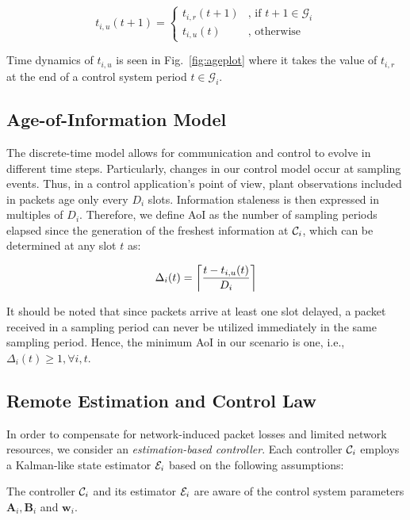 \begin{equation}
  \label{eq:t_u}
  t_{i, u}(t+1) =
  \begin{cases}
  t_{i, r}(t+1) & \text{, if } t+1 \in \mathcal{G}_i \\ 
  t_{i, u}(t) & \text{, otherwise}	
  \end{cases} 
\end{equation}

Time dynamics of $t_{i,u}$ is seen in Fig.~\ref{fig:ageplot} where it takes the
value of $t_{i,r}$ at the end of a control system period $t \in \mathcal{G}_i$.

\subsection{Age-of-Information Model}
The discrete-time model allows for communication and control to evolve in
different time steps. Particularly, changes in our control model occur at
sampling events. Thus, in a control application's point of view, plant
observations included in packets age only every $D_i$ slots. Information
staleness is then expressed in multiples of $D_i$. Therefore, we define AoI as
the number of sampling periods elapsed since the generation of the freshest
information at $\mathcal{C}_i$, which can be determined at any slot $t$ as:

\begin{equation}
  \label{eq:aoi}
  \Delta_i(t) = \left\lceil \dfrac{t - t_{i,u}(t)}{D_{i}} \right\rceil 
\end{equation}

It should be noted that since packets arrive at least one slot delayed, a packet
received in a sampling period can never be utilized immediately in the same
sampling period. Hence, the minimum AoI in our scenario is one, i.e.,
$\Delta_i(t) \ge 1,\forall i,t$.

\subsection{Remote Estimation and Control Law}
In order to compensate for network-induced packet losses and limited network
resources, we consider an \textit{estimation-based controller}. Each controller
$\mathcal{C}_i$ employs a Kalman-like state estimator $\mathcal{E}_i$ based on the
following assumptions:

\begin{theorem}
  The controller $\mathcal{C}_i$ and its estimator $\mathcal{E}_i$ are aware of the
  control system parameters $\boldsymbol{A}_i, \boldsymbol{B}_i$ and
  $\boldsymbol{w}_i$.
\end{theorem}

